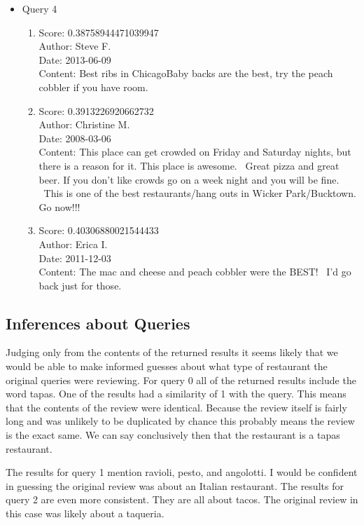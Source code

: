 \documentclass[paper=a4, fontsize=11pt]{jhwhw} %
\begin{document}
\begin{itemize}
\begin{enumerate}
        \end{enumerate}
    \item Query 4
        \begin{enumerate}
            \item Score: 0.38758944471039947\\
                Author: Steve F.\\
                Date: 2013-06-09\\
                Content: Best ribs in ChicagoBaby backs are the best, try the peach cobbler if you have room.
            \item Score: 0.3913226920662732\\
                Author: Christine M.\\
                Date: 2008-03-06\\
                Content: This place can get crowded on Friday and Saturday nights, but there is a reason for it. This place is awesome.  Great pizza and great beer. If you don't like crowds go on a week night and you will be fine.  This is one of the best restaurants/hang outs in Wicker Park/Bucktown. Go now!!! 
            \item Score: 0.40306880021544433\\
                Author: Erica I.\\
                Date: 2011-12-03\\
                Content: The mac and cheese and peach cobbler were the BEST!  I'd go back just for those.
        \end{enumerate}
\end{itemize}

\subsection{Inferences about Queries}
Judging only from the contents of the returned results it seems likely that we would be able to make informed guesses about what type of restaurant the original queries were reviewing. For query 0 all of the returned results include the word tapas. One of the results had a similarity of 1 with the query. This means that the contents of the review were identical. Because the review itself is fairly long and was unlikely to be duplicated by chance this probably means the review is the exact same. We can say conclusively then that the restaurant is a tapas restaurant.

The results for query 1 mention ravioli, pesto, and angolotti. I would be confident in guessing the original review was about an Italian restaurant. The results for query 2 are even more consistent. They are all about tacos. The original review in this case was likely about a taqueria.
\end{document}
